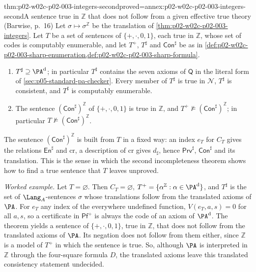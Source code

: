 \begin{hbtheorem}{thm:p02-w02c-p02-003-integers-second}{proved=annex:p02-w02c-p02-003-integers-second}{A sentence true in \(\mathbb Z\) that does not follow from a given effective true theory (Barwise, p.~16)}
Let \(\sigma\mapsto\sigma^{\mathbb Z}\) be the translation of
\cref{thm:p02-w02c-p02-003-integers}.  Let \(T\) be a set of sentences of
\(\{+,\cdot,0,1\}\), each true in \(\mathbb Z\), whose set of codes is
computably enumerable, and let \(T^{+}\), \(T^{\sharp}\) and
\(\mathsf{Con}^{\sharp}\) be as in
\cref{def:p02-w02c-p02-003-sharp-enumeration,def:p02-w02c-p02-003-sharp-formula}.
\begin{enumerate}
\item \(T^{\sharp}\supseteq\PA^{\rm d}\); in particular \(T^{\sharp}\)
      contains the seven axioms of \(\mathsf Q\) in the literal form of
      \cref{sec:p05-standard-pa-checker}.  Every member of \(T^{\sharp}\) is
      true in \(\mathcal N\), \(T^{\sharp}\) is consistent, and \(T^{\sharp}\)
      is computably enumerable.
\item The sentence \((\mathsf{Con}^{\sharp})^{\mathbb Z}\) of
      \(\{+,\cdot,0,1\}\) is true in \(\mathbb Z\), and
      \(T^{+}\not\models(\mathsf{Con}^{\sharp})^{\mathbb Z}\); in
      particular \(T\not\models(\mathsf{Con}^{\sharp})^{\mathbb Z}\).
\end{enumerate}
\end{hbtheorem}

The sentence \((\mathsf{Con}^{\sharp})^{\mathbb Z}\) is built from \(T\) in
a fixed way: an index \(e_T\) for \(C_T\) gives the relations
\(\mathsf{En}^{\sharp}\) and \(\mathrm{cr}\), a description of
\(\mathrm{cr}\) gives \(d_{\sharp}\), hence \(\mathsf{Prv}^{\sharp}\),
\(\mathsf{Con}^{\sharp}\) and its translation.  This is the sense in which
the second incompleteness theorem shows how to find a true sentence that
\(T\) leaves unproved.

\emph{Worked example.}  Let \(T=\varnothing\).  Then \(C_T=\varnothing\),
\(T^{+}=\{\alpha^{\mathbb Z}:\alpha\in\PA^{\rm d}\}\), and
\(T^{\sharp}\) is the set of \(\Lang_A\)-sentences \(\sigma\) whose
translations follow from the translated axioms of \(\PA\).  For \(e_T\) any
index of the everywhere undefined function, \(V(e_T,a,s)=0\) for all
\(a,s\), so a certificate in \(\mathsf{Pf}^{+}\) is always the code of an
axiom of \(\PA^{\rm d}\).  The theorem yields a sentence of
\(\{+,\cdot,0,1\}\), true in \(\mathbb Z\), that does not follow from the
translated axioms of \(\PA\).  Its negation does not follow from them
either, since \(\mathbb Z\) is a model of \(T^{+}\) in which the sentence
is true.  So, although \(\PA\) is interpreted in \(\mathbb Z\) through the
four-square formula \(D\), the translated axioms leave this translated
consistency statement undecided.

